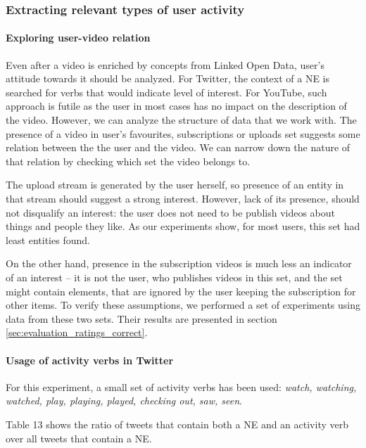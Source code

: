 \subsubsection{Extracting relevant types of user activity}
\label{sec:user_activity}

\paragraph{Exploring user-video relation} Even after a video is enriched by
concepts from Linked Open Data, user's attitude towards it should be analyzed.
For Twitter, the context of a NE is searched for verbs that would indicate
level of interest. For YouTube, such approach is futile as the user in most
cases has no impact on the description of the video. However, we can analyze
the structure of data that we work with. The presence of a video in
user's favourites, subscriptions or uploads set suggests some relation between
the the user and the video. We can narrow down the nature of that relation by
checking which set the video belongs to.

The upload stream is generated by the user herself, so presence of an entity in
that stream should suggest a strong interest. However, lack of its presence, should not
disqualify an interest: the user does not need to be publish videos about things
and people they like. As our experiments show, for most users, this set had least
entities found.

On the other hand, presence in the subscription videos is much less an
indicator of an interest -- it is not the user, who publishes videos in this
set, and the set might contain elements, that are ignored by the user keeping
the subscription for other items. To verify these assumptions, we performed a
set of experiments using data from these two sets. Their results are presented
in section \ref{sec:evaluation_ratings_correct}.

\paragraph{Usage of activity verbs in Twitter}
For this experiment, a small set of activity verbs has been used: \textit{watch, watching, watched,
play, playing, played, checking out, saw, seen}.

Table 13 shows the ratio of tweets that contain both a NE and an activity verb over all
tweets that contain a NE.

